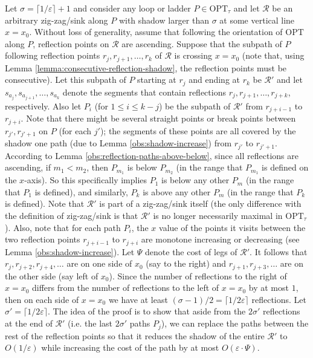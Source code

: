 \documentclass[pdflatex,sn-mathphys-num]{sn-jnl}
\theoremstyle{thmstyleone}
\newcommand{\eps}{\varepsilon}
\newcommand{\OPT}{{\text{OPT}}}
\begin{document}
Let $\sigma=\lceil 1/\eps\rceil + 1$  and
consider any loop or ladder $P\in \OPT_\tau$ and let $\mathcal R$ be an arbitrary zig-zag/sink along $P$ with shadow larger than $\sigma$ at some vertical line $x=x_0$. Without loss of generality, assume that following the orientation of $\OPT$ along $P$, reflection points on $\mathcal R$ are ascending. Suppose that the subpath of $P$ following reflection points $r_j,r_{j+1},\ldots,r_k$ of $\mathcal R$ is crossing $x=x_0$ (note that, using Lemma \ref{lemma:consecutive-reflection-shadow}, the reflection points must be consecutive).
Let this subpath of $P$ starting at $r_j$ and ending at $r_k$ be $\mathcal R'$
and let $s_{a_j}, s_{a_{j+1}},\dots, s_{a_k}$ denote the segments that contain reflections $r_{j}, r_{j + 1},\dots, r_{j + k}$, respectively.	Also let $P_i$ (for $1\leq i\leq k-j$) be the subpath of $\mathcal R'$ from $r_{j+i-1}$ to $r_{j+i}$. 
Note that there might be several straight points or break points between $r_{j'},r_{j'+1}$ on $P$ (for each $j'$); 
the segments of these points are all covered by the shadow one path (due to Lemma \ref{obs:shadow-increase}) from $r_{j'}$ to $r_{j'+1}$.
According to Lemma \ref{obs:reflection-paths-above-below}, since all reflections are ascending, if $m_1 < m_2$, then $P_{m_1}$ is below $P_{m_2}$ (in the range that $P_{m_1}$ is defined on the $x$-axis).
So this specifically implies $P_1$ is below any other $P_m$ (in the range that $P_1$ is defined), and similarly, $P_k$ is above any other $P_m$ (in the range that $P_k$ is defined).
Note that $\mathcal R'$ is part of a zig-zag/sink itself (the only difference with the definition of zig-zag/sink is that $\mathcal R'$ is no longer necessarily maximal in $ \OPT_\tau $). 
Also, note that for each path $P_i$, the $x$ value of the points it visits
between the two reflection points $r_{j+i-1}$ to $r_{j+i}$ are monotone
increasing or decreasing (see Lemma \ref{obs:shadow-increase}).
Let $\Psi$ denote the cost of legs of $\mathcal R'$.
It follows that $r_j,r_{j+2},r_{j+4},\ldots$ are on one side of $x_0$
(say to the right) and $r_{j+1},r_{j+3},\ldots$ are on the other side (say left of $x_0$). Since the number of reflections to the right of $x = x_0$ differs from the number of reflections to the left of $x = x_0$ by at most $1$, then on each side of $x = x_0$ we have at least $(\sigma-1)/2 = \lceil1/2\eps\rceil$ reflections. Let $\sigma'=\lceil 1/2\eps\rceil$.
The idea of the proof is to show that aside from the  $2\sigma'$ reflections at the end of $\mathcal R'$ (i.e. the last $2\sigma'$ paths $P_{j}$), we can replace the paths between the rest of the reflection points so that it reduces the shadow of the entire $\mathcal R'$ to $O(1/\eps)$ while increasing the cost of the path by at most $O(\eps\cdot\Psi)$. 
\end{document}
